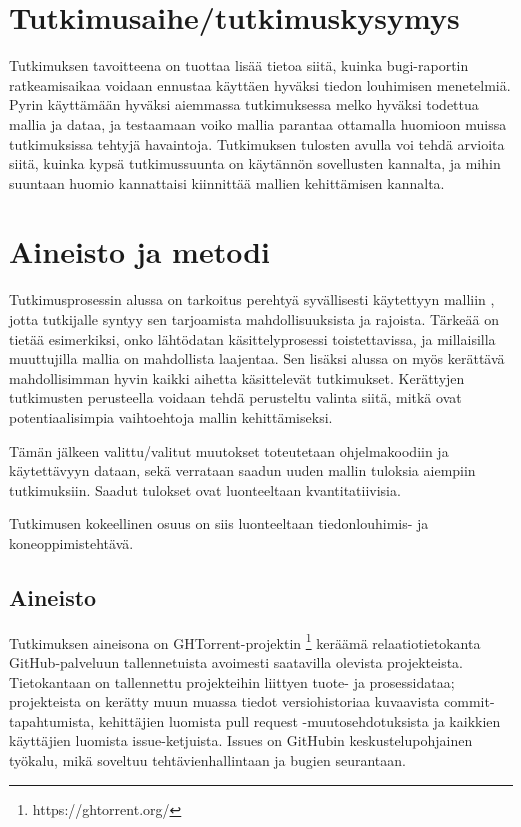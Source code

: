 \documentclass[utf8]{gradu3}
\begin{document}
\chapter{Tutkimusaihe/tutkimuskysymys}
Tutkimuksen tavoitteena on tuottaa lisää tietoa siitä, kuinka bugi-raportin
ratkeamisaikaa voidaan ennustaa käyttäen hyväksi tiedon louhimisen menetelmiä.
Pyrin käyttämään hyväksi aiemmassa tutkimuksessa \parencite{riivo-2016} melko
hyväksi todettua mallia ja dataa, ja testaamaan voiko mallia parantaa ottamalla
huomioon muissa tutkimuksissa tehtyjä havaintoja. Tutkimuksen tulosten avulla
voi tehdä arvioita siitä, kuinka kypsä tutkimussuunta on käytännön sovellusten
kannalta, ja mihin suuntaan huomio kannattaisi kiinnittää mallien kehittämisen
kannalta.

\chapter{Aineisto ja metodi}
Tutkimusprosessin alussa on tarkoitus perehtyä syvällisesti käytettyyn malliin
\parencite{riivo-2016}, jotta tutkijalle syntyy sen tarjoamista
mahdollisuuksista ja rajoista. Tärkeää on tietää esimerkiksi, onko lähtödatan
käsittelyprosessi toistettavissa, ja millaisilla muuttujilla mallia on
mahdollista laajentaa. Sen lisäksi alussa on myös kerättävä mahdollisimman hyvin
kaikki aihetta käsittelevät tutkimukset. Kerättyjen tutkimusten perusteella
voidaan tehdä perusteltu valinta siitä, mitkä ovat potentiaalisimpia
vaihtoehtoja mallin kehittämiseksi.

Tämän jälkeen valittu/valitut muutokset toteutetaan ohjelmakoodiin ja
käytettävyyn dataan, sekä verrataan saadun uuden mallin tuloksia aiempiin
tutkimuksiin. Saadut tulokset ovat luonteeltaan kvantitatiivisia.

Tutkimusen kokeellinen osuus on siis luonteeltaan tiedonlouhimis- ja
koneoppimistehtävä.

\section{Aineisto}
Tutkimuksen aineisona on GHTorrent-projektin \footnote{https://ghtorrent.org/}
\parencite{Gousi13} keräämä relaatiotietokanta GitHub-palveluun tallennetuista
avoimesti saatavilla olevista projekteista. Tietokantaan on tallennettu
projekteihin liittyen tuote- ja prosessidataa; projekteista on kerätty muun
muassa tiedot versiohistoriaa kuvaavista commit-tapahtumista, kehittäjien
luomista pull request -muutosehdotuksista ja kaikkien käyttäjien luomista
issue-ketjuista. Issues on GitHubin keskustelupohjainen työkalu, mikä soveltuu
tehtävienhallintaan ja bugien seurantaan.
\end{document}
